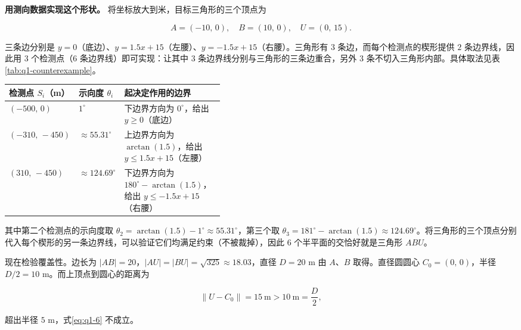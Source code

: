 \documentclass[UTF8,a4paper,zihao=5,fontset=fandol]{ctexart}
\renewcommand{\arraystretch}{1.2}
\begin{document}
\textbf{用测向数据实现这个形状。} 将坐标放大到米，目标三角形的三个顶点为

\[
A=(-10,\,0),\quad B=(10,\,0),\quad U=(0,\,15).
\]

三条边分别是 $y=0$（底边）、$y=1.5x+15$（左腰）、$y=-1.5x+15$（右腰）。三角形有 $3$ 条边，而每个检测点的楔形提供 $2$ 条边界线，因此用 $3$ 个检测点（$6$ 条边界线）即可实现：让其中 $3$ 条边界线分别与三角形的三条边重合，另外 $3$ 条不切入三角形内部。具体取法见表\ref{tab:q1-counterexample}。

\begin{center}
\begin{minipage}{\linewidth}
\centering
{}\label{tab:q1-counterexample}

\renewcommand{\arraystretch}{1.3}
\begin{tabularx}{0.98\linewidth}{>{\centering\arraybackslash}p{0.22\linewidth}>{\centering\arraybackslash}p{0.20\linewidth}>{\raggedright\arraybackslash}X}
\toprule
\textbf{检测点 $S_i$（m）} & \textbf{示向度 $\theta_i$} & \textbf{起决定作用的边界} \\
\midrule
$(-500,\,0)$ & $1^\circ$ & 下边界方向为 $0^\circ$，给出 $y\ge0$（底边） \\
$(-310,\,-450)$ & $\approx55.31^\circ$ & 上边界方向为 $\arctan(1.5)$，给出 $y\le1.5x+15$（左腰） \\
$(310,\,-450)$ & $\approx124.69^\circ$ & 下边界方向为 $180^\circ-\arctan(1.5)$，给出 $y\le-1.5x+15$（右腰） \\
\bottomrule
\end{tabularx}
\end{minipage}
\end{center}

其中第二个检测点的示向度取 $\theta_2=\arctan(1.5)-1^\circ\approx55.31^\circ$，第三个取 $\theta_3=181^\circ-\arctan(1.5)\approx124.69^\circ$。将三角形的三个顶点分别代入每个楔形的另一条边界线，可以验证它们均满足约束（不被裁掉），因此 $6$ 个半平面的交恰好就是三角形 $ABU$。

现在检验覆盖性。边长为 $|AB|=20$，$|AU|=|BU|=\sqrt{325}\approx18.03$，直径 $D=20$ m 由 $A$、$B$ 取得。直径圆圆心 $C_0=(0,\,0)$，半径 $D/2=10$ m。而上顶点到圆心的距离为

\[
\|U-C_0\|=15\ \text{m}>10\ \text{m}=\frac D2,
\]

超出半径 $5$ m，式\eqref{eq:q1-6} 不成立。

\begin{center}
\begin{minipage}{\linewidth}
\centering
\QOneCaseFigure
{}
\label{fig:q1-counterexample}
\end{minipage}
\end{center}
\end{document}
